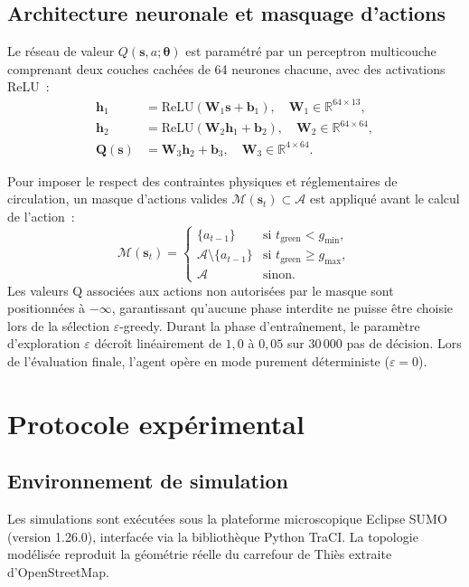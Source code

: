 \documentclass[11pt,a4paper]{article}
\begin{document}
\subsection{Architecture neuronale et masquage d'actions}
Le réseau de valeur $Q(\mathbf{s}, a; \boldsymbol{\theta})$ est paramétré par un perceptron multicouche comprenant deux couches cachées de 64 neurones chacune, avec des activations ReLU~:
\begin{align}
\mathbf{h}_1 &= \text{ReLU}(\mathbf{W}_1 \mathbf{s} + \mathbf{b}_1), \quad \mathbf{W}_1 \in \mathbb{R}^{64 \times 13}, \\
\mathbf{h}_2 &= \text{ReLU}(\mathbf{W}_2 \mathbf{h}_1 + \mathbf{b}_2), \quad \mathbf{W}_2 \in \mathbb{R}^{64 \times 64}, \\
\mathbf{Q}(\mathbf{s}) &= \mathbf{W}_3 \mathbf{h}_2 + \mathbf{b}_3, \quad \mathbf{W}_3 \in \mathbb{R}^{4 \times 64}.
\end{align}

Pour imposer le respect des contraintes physiques et réglementaires de circulation, un masque d'actions valides $\mathcal{M}(\mathbf{s}_t) \subset \mathcal{A}$ est appliqué avant le calcul de l'action~:
\begin{equation}
\mathcal{M}(\mathbf{s}_t) = \begin{cases}
\{a_{t-1}\} & \text{si } t_{\text{green}} < g_{\min}, \\
\mathcal{A} \setminus \{a_{t-1}\} & \text{si } t_{\text{green}} \ge g_{\max}, \\
\mathcal{A} & \text{sinon.}
\end{cases}
\end{equation}
Les valeurs Q associées aux actions non autorisées par le masque sont positionnées à $-\infty$, garantissant qu'aucune phase interdite ne puisse être choisie lors de la sélection $\varepsilon$-greedy. Durant la phase d'entraînement, le paramètre d'exploration $\varepsilon$ décroît linéairement de $1{,}0$ à $0{,}05$ sur $30\,000$ pas de décision. Lors de l'évaluation finale, l'agent opère en mode purement déterministe ($\varepsilon = 0$).

\section{Protocole expérimental}
\label{sec:setup}

\subsection{Environnement de simulation}
Les simulations sont exécutées sous la plateforme microscopique Eclipse SUMO (version 1.26.0), interfacée via la bibliothèque Python TraCI. La topologie modélisée reproduit la géométrie réelle du carrefour de Thiès extraite d'OpenStreetMap.
\end{document}
